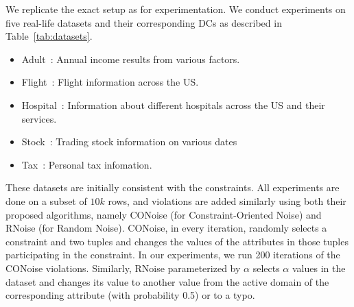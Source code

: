 We replicate the exact setup as \citet{LivshitsBKS20} for experimentation. We conduct experiments on five real-life datasets and their corresponding DCs as described in Table~\ref{tab:datasets}.
\ifpaper
\else
\begin{itemize}
    \item Adult~\cite{misc_adult_2}: Annual income results from various factors.
    \item Flight~\cite{flight}: Flight information across the US.
    \item Hospital~\cite{hospital}: Information about different hospitals across the US and their services.
    \item Stock~\cite{oleh_onyshchak_2020}: Trading stock information  on various dates
    \item Tax~\cite{chu2013discovering}: Personal tax infomation.
\end{itemize}
\fi
These datasets are initially consistent with the constraints.  All experiments are done on a subset of $10k$ rows, and violations are added similarly using both their proposed algorithms, namely CONoise (for Constraint-Oriented Noise) and RNoise (for Random Noise). 
\ifpaper
CONoise, in every iteration, randomly selects a constraint and two tuples and changes the values of the attributes in those tuples participating in the constraint. In our experiments, we run 200 iterations of the CONoise violations. Similarly, RNoise parameterized by $\alpha$ selects $\alpha$ values in the dataset and changes its value to another value from the active domain of the corresponding attribute (with probability 0.5) or to a typo. 
